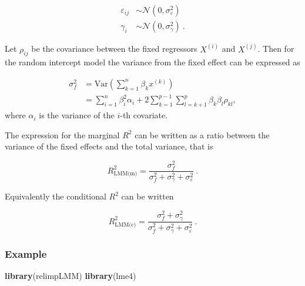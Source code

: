 \documentclass[
]{article}
\newenvironment{Shaded}{\begin{snugshade}}{\end{snugshade}}
\newcommand{\KeywordTok}[1]{\textcolor[rgb]{0.13,0.29,0.53}{\textbf{#1}}}
\newcommand{\NormalTok}[1]{#1}
\begin{document}
\begin{equation*}
\begin{split}
    \varepsilon_{ij} &\sim \mathcal{N} \left(0, \sigma_\varepsilon^2 \right)\\
    \gamma_{i} &\sim \mathcal{N} \left(0, \sigma_\gamma^2 \right)\ .
\end{split}
\end{equation*}

Let \(\rho_{ij}\) be the covariance between the fixed regressors
\(X^{(i)}\) and \(X^{(j)}\). Then for the random intercept model the
variance from the fixed effect can be expressed as

\begin{equation}
    \begin{split}
        \sigma_f^2 &= \textrm{Var}\left(\sum_{k=1}^n \beta_k x^{(k)}\right)\\
        & = \sum_{i=1}^n \beta_i^2\alpha_i  +2\sum_{k=1}^{p-1}\sum_{l=k+1}^p \beta_k\beta_l\rho_{kl} ,
    \end{split}
    \label{fixed_effect_var}
\end{equation} where \(\alpha_i\) is the variance of the \(i\)-th
covariate.

The expression for the marginal \(R^2\) can be written as a ratio
between the variance of the fixed effects and the total variance, that
is

\begin{equation}
    R^2_{\textrm{LMM(m)}} = \frac{\sigma_f^2}{\sigma_f^2 +\sigma_\gamma^2  + \sigma_\varepsilon^2} \ .
    \label{marginalR2}
\end{equation}

Equivalently the conditional \(R^2\) can be written

\begin{equation}
    R^2_{\textrm{LMM(c)}} = \frac{\sigma_f^2 + \sigma_\gamma^2}{\sigma_f^2 +\sigma_\gamma^2 + \sigma_\varepsilon^2}\ .
    \label{conditional_R2}
\end{equation}

\hypertarget{example}{%
\subsubsection{Example}\label{example}}

\begin{Shaded}
\begin{Highlighting}[]
\KeywordTok{library}\NormalTok{(relimpLMM)}
\KeywordTok{library}\NormalTok{(lme4)}
\end{Highlighting}
\end{Shaded}
\end{document}
